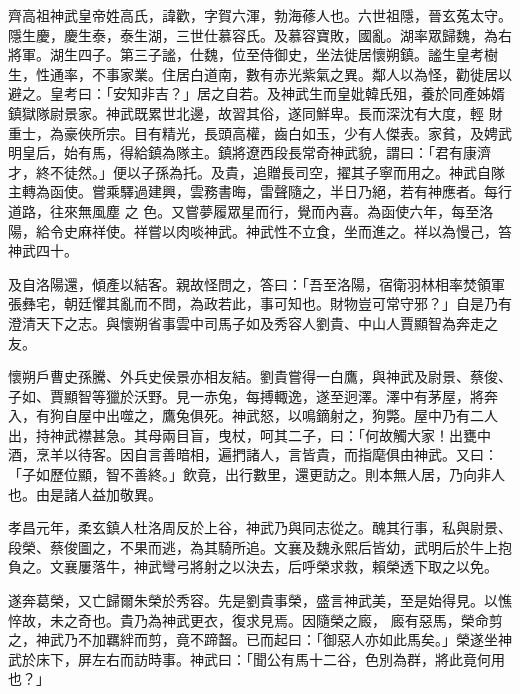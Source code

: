 
\begin{pinyinscope}

 齊高祖神武皇帝姓高氏，諱歡，字賀六渾，勃海蓚人也。六世祖隱，晉玄菟太守。隱生慶，慶生泰，泰生湖，三世仕慕容氏。及慕容寶敗，國亂。湖率眾歸魏，為右將軍。湖生四子。第三子謐，仕魏，位至侍御史，坐法徙居懷朔鎮。謐生皇考樹生，性通率，不事家業。住居白道南，數有赤光紫氣之異。鄰人以為怪，勸徙居以避之。皇考曰：「安知非吉？」居之自若。及神武生而皇妣韓氏殂，養於同產姊婿鎮獄隊尉景家。神武既累世北邊，故習其俗，遂同鮮卑。長而深沈有大度，輕
 財重士，為豪俠所宗。目有精光，長頭高權，齒白如玉，少有人傑表。家貧，及娉武明皇后，始有馬，得給鎮為隊主。鎮將遼西段長常奇神武貌，謂曰：「君有康濟才，終不徒然。」便以子孫為托。及貴，追贈長司空，擢其子寧而用之。神武自隊主轉為函使。嘗乘驛過建興，雲務書晦，雷聲隨之，半日乃絕，若有神應者。每行道路，往來無風塵
 之
 色。又嘗夢履眾星而行，覺而內喜。為函使六年，每至洛陽，給令史麻祥使。祥嘗以肉啖神武。神武性不立食，坐而進之。祥以為慢己，笞神武四十。



 及自洛陽還，傾產以結客。親故怪問之，答曰：「吾至洛陽，宿衛羽林相率焚領軍張彝宅，朝廷懼其亂而不問，為政若此，事可知也。財物豈可常守邪？」自是乃有澄清天下之志。與懷朔省事雲中司馬子如及秀容人劉貴、中山人賈顯智為奔走之友。



 懷朔戶曹史孫騰、外兵史侯景亦相友結。劉貴嘗得一白鷹，與神武及尉景、蔡俊、子如、賈顯智等獵於沃野。見一赤兔，每搏輙逸，遂至迥澤。澤中有茅屋，將奔入，有狗自屋中出噬之，鷹兔俱死。神武怒，以鳴鏑射之，狗斃。屋中乃有二人出，持神武襟甚急。其母兩目盲，曳杖，呵其二子，曰：「何故觸大家！出甕中
 酒，烹羊以待客。因自言善暗相，遍捫諸人，言皆貴，而指麾俱由神武。又曰：「子如歷位顯，智不善終。」飲竟，出行數里，還更訪之。則本無人居，乃向非人也。由是諸人益加敬異。



 孝昌元年，柔玄鎮人杜洛周反於上谷，神武乃與同志從之。醜其行事，私與尉景、段榮、蔡俊圖之，不果而逃，為其騎所追。文襄及魏永熙后皆幼，武明后於牛上抱負之。文襄屢落牛，神武彎弓將射之以決去，后呼榮求救，賴榮透下取之以免。



 遂奔葛榮，又亡歸爾朱榮於秀容。先是劉貴事榮，盛言神武美，至是始得見。以憔悴故，未之奇也。貴乃為神武更衣，復求見焉。因隨榮之廄，
 廄有惡馬，榮命剪之，神武乃不加羈絆而剪，竟不蹄齧。已而起曰：「御惡人亦如此馬矣。」榮遂坐神武於床下，屏左右而訪時事。神武曰：「聞公有馬十二谷，色別為群，將此竟何用也？」




\end{pinyinscope}
